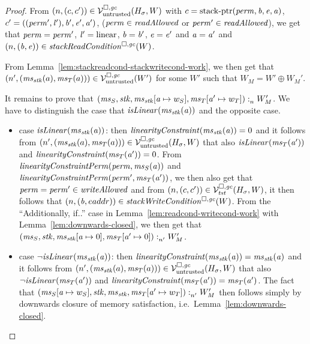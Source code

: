 \begin{proof}
  From $\npair{(c,c')}\in\lrv(H_\sigma,W)$ with $c = \stkptr{\perm,\baddr,\eaddr,\aaddr}$, $c' = ((\perm',\lin'),\baddr',\eaddr',\aaddr')$, ($\perm \in \readAllowed{}$ or $\perm' \in \readAllowed{}$), we get that $\perm = \perm'$, $\lin' = \linear$, $\baddr = \baddr'$, $\eaddr = \eaddr'$ and $\aaddr = \aaddr'$ and $\npair{(\baddr,\eaddr)} \in \stackReadCond{W}$.

  From Lemma~\ref{lem:stackreadcond-stackwritecond-work}, we then get that $\npair[n']{(\ms_\stk(a),\ms_T(a))}\in\lrv(W')$ for some $W'$ such that $W_M = W' \oplus W_M'$.


  It remains to prove that $\memSat{(\ms_S,\stk,\ms_\stk\update{\aaddr}{w_S},\ms_T\update{\aaddr'}{w_T})}{W_M'}$.
  We have to distinguish the case that $\isLinear{\ms_\stk(\aaddr)}$ and the opposite case.
  \begin{itemize}
  \item case $\isLinear{\ms_\stk(\aaddr)}$: then $\linCons{\ms_\stk(\aaddr)} = 0$ and it follows from $\npair[n']{(\ms_\stk(a),\ms_T(a))}\in\lrv(H_\sigma,W)$ that also $\isLinear{\ms_T(\aaddr')}$  and $\linCons{\ms_T(\aaddr')} = 0$.
    From $\linConsPerm{\perm}{\ms_S(\aaddr)}$ and $\linConsPerm{\perm'}{\ms_T(\aaddr')}$, we then also get that $\perm = \perm' \in \writeAllowed{}$ and from $\npair{(c,c')}\in\lrvg{\trust}(H_\sigma,W)$, it then follows that $\npair{(\baddr,eaddr)} \in \stackWriteCond{W}$.
    From the ``Additionally, if..'' case in Lemma~\ref{lem:readcond-writecond-work} with Lemma~\ref{lem:downwards-closed}, we then get that $\memSat[n']{(\ms_S,\stk,\ms_\stk\update{\aaddr}{0},\ms_T\update{\aaddr'}{0})}{W_M'}$.

  \item case $\neg\isLinear{\ms_\stk(\aaddr)}$: then $\linCons{\ms_\stk(\aaddr)} = \ms_\stk(\aaddr)$ and it follows from $\npair[n']{(\ms_\stk(a),\ms_T(a))}\in\lrv(H_\sigma,W)$ that also $\neg\isLinear{\ms_T(\aaddr')}$ 
    and $\linCons{\ms_T(\aaddr')} = \ms_T(\aaddr')$.
    The fact that $\memSat[n']{(\ms_S\update{\aaddr}{w_S},\stk,\ms_\stk,\ms_T\update{\aaddr'}{w_T})}{W_M'}$ then follows simply by downwards closure of memory satisfaction, i.e.\ Lemma~\ref{lem:downwards-closed}.
  \end{itemize}
\end{proof}

